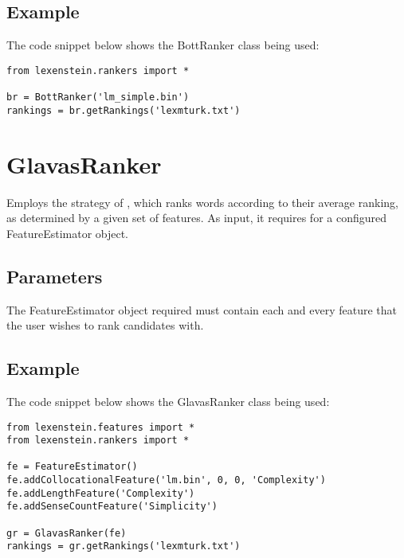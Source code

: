 \subsection{Example}

The code snippet below shows the BottRanker class being used:

\begin{lstlisting}
from lexenstein.rankers import *

br = BottRanker('lm_simple.bin')
rankings = br.getRankings('lexmturk.txt')
\end{lstlisting}











\section{GlavasRanker}

Employs the strategy of \cite{glavas2015}, which ranks words according to their average ranking, as determined by a given set of features. As input, it requires for a configured FeatureEstimator object.

\subsection{Parameters}

The FeatureEstimator object required must contain each and every feature that the user wishes to rank candidates with.

\subsection{Example}

The code snippet below shows the GlavasRanker class being used:

\begin{lstlisting}
from lexenstein.features import *
from lexenstein.rankers import *

fe = FeatureEstimator()
fe.addCollocationalFeature('lm.bin', 0, 0, 'Complexity')
fe.addLengthFeature('Complexity')
fe.addSenseCountFeature('Simplicity')

gr = GlavasRanker(fe)
rankings = gr.getRankings('lexmturk.txt')
\end{lstlisting}